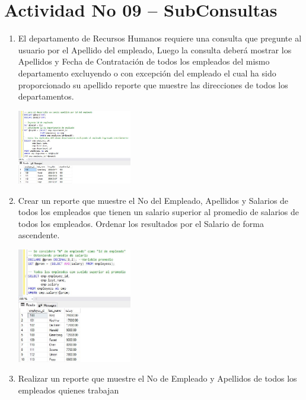 \section{Actividad No 09 – SubConsultas} 
		
\begin{enumerate}[1.]
	\item El departamento de Recursos Humanos requiere una consulta que pregunte al usuario por el Apellido del empleado, Luego la consulta deber\'a mostrar los Apellidos y Fecha de Contrataci\'on de todos los empleados del mismo departamento excluyendo o con excepción del empleado el cual ha sido proporcionado su apellido reporte que muestre las direcciones de todos los departamentos.

\begin{itemize}
	\begin{center}
	\includegraphics[width=5cm]{./Imagenes/actividad0901} 
	\end{center}
\end{itemize}

	\item Crear un reporte que muestre el No del Empleado, Apellidos y Salarios de todos los empleados que tienen un salario superior al promedio de salarios de todos los empleados. Ordenar los resultados por el Salario de forma ascendente.

\begin{itemize}
	\begin{center}
	\includegraphics[width=5cm]{./Imagenes/actividad0902} 
	\end{center}
\end{itemize}

	\item Realizar un reporte que muestre el No de Empleado y Apellidos de todos los empleados quienes trabajan


\end{enumerate}
